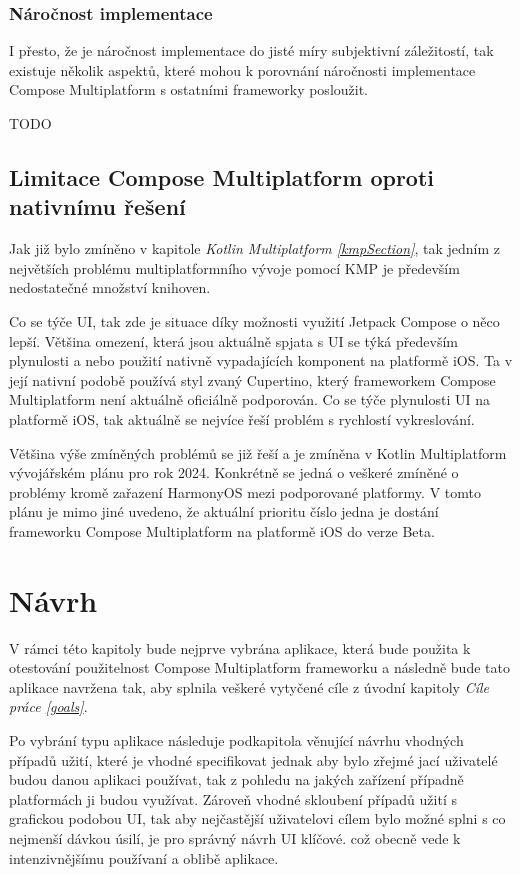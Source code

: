 \subsection{Náročnost implementace}
I přesto, že je náročnost implementace do jisté míry subjektivní záležitostí, tak existuje několik aspektů, které mohou k porovnání 
náročnosti implementace Compose Multiplatform s ostatními frameworky posloužit. 

TODO

\section{Limitace Compose Multiplatform oproti nativnímu řešení} 
Jak již bylo zmíněno v kapitole \textit{Kotlin Multiplatform \ref{kmpSection}}, tak jedním z největších problému multiplatformního vývoje pomocí KMP je
především nedostatečné množství knihoven. 

Co se týče UI, tak zde je situace díky možnosti využití Jetpack Compose o něco lepší. Většina omezení, která jsou
aktuálně spjata s UI se týká především plynulosti a nebo použití nativně vypadajících komponent na platformě iOS.
Ta v její nativní podobě používá styl zvaný Cupertino, který frameworkem Compose Multiplatform není aktuálně oficiálně podporován. 
Co se týče plynulosti UI na platformě iOS, tak aktuálně se nejvíce řeší problém s rychlostí vykreslování.

Většina výše zmíněných problémů se již řeší a je zmíněna v Kotlin Multiplatform vývojářském plánu pro rok 2024. \cite{KMPRoaddMap} Konkrétně
se jedná o veškeré zmíněné o problémy kromě zařazení HarmonyOS mezi podporované platformy.%
V tomto plánu je mimo jiné uvedeno, že aktuální prioritu číslo jedna je dostání frameworku Compose Multiplatform na platformě iOS do verze Beta. \cite{KMPRoaddMap}

\chapter{Návrh}
V rámci této kapitoly bude nejprve vybrána aplikace, která bude použita k otestování použitelnost Compose Multiplatform frameworku a následně
bude tato aplikace navržena tak, aby splnila veškeré vytyčené cíle z úvodní kapitoly \textit{Cíle práce \ref{goals}}.

Po vybrání typu aplikace následuje podkapitola věnující návrhu vhodných případů užití, které je vhodné specifikovat jednak aby bylo zřejmé jací 
uživatelé budou danou aplikaci používat, tak z pohledu na jakých zařízení případně platformách ji budou využívat. 
Zároveň vhodné skloubení případů užití s grafickou podobou UI, tak aby nejčastější uživatelovi cílem bylo možné splni s co nejmenší dávkou úsilí, 
je pro správný návrh UI klíčové. 
což obecně vede k intenzivnějšímu používaní a oblibě aplikace.



